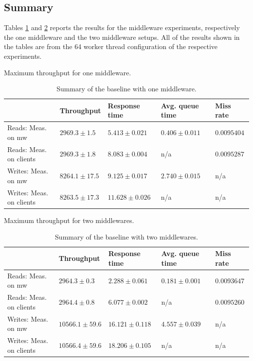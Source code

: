 \documentclass[11pt,a4paper]{article}
\begin{document}
\subsection{Summary} \label{sec:mwb-summary}
Tables \ref{tab:mwb1-summary} and \ref{tab:mwb2-summary} reports the results for the middleware experiments, respectively the one middleware and the two middleware setups. All of the results shown in the tables are from the 64 worker thread configuration of the respective experiments.

\begin{table}[h]
\centering
{Maximum throughput for one middleware.}
\begin{tabular}{|l|p{2.3cm}|p{2.3cm}|p{2.7cm}|p{2.3cm}|}
\hline                       & Throughput        & {\small Response time}      & {\small Avg. queue time} & Miss rate \\ 
\hline Reads: Meas. on mw       & $2969.3 \pm 1.5$  & $5.413 \pm 0.021$  & $0.406 \pm 0.011$  & $0.0095404$ \\ 
\hline Reads: Meas. on clients  & $2969.3 \pm 1.8$  & $8.083 \pm 0.004$  & n/a                & $0.0095287$ \\ 
\hline Writes: Meas. on mw      & $8264.1 \pm 17.5$ & $9.125 \pm 0.017$  & $2.740 \pm 0.015$  & n/a \\ 
\hline Writes: Meas. on clients & $8263.5 \pm 17.3$ & $11.628 \pm 0.026$ & n/a                & n/a \\ 
\hline 
\end{tabular}
\caption{Summary of the baseline with one middleware.} \label{tab:mwb1-summary}
\end{table}
\begin{table}[h]
\centering
{Maximum throughput for two middlewares.}
\begin{tabular}{|l|p{2.3cm}|p{2.3cm}|p{2.7cm}|p{2.3cm}|}
\hline                      & Throughput         & {\small Response time}      & {\small Avg. queue time} & Miss rate \\ 
\hline Reads: Meas. on mw       & $2964.3 \pm 0.3$   & $2.288 \pm 0.061$  & $0.181 \pm 0.001$  & $0.0093647$ \\ 
\hline Reads: Meas. on clients  & $2964.4 \pm 0.8$   & $6.077 \pm 0.002$  & n/a                & $0.0095260$ \\ 
\hline Writes: Meas. on mw      & $10566.1 \pm 59.6$ & $16.121 \pm 0.118$ & $4.557 \pm 0.039$  & n/a     \\ 
\hline Writes: Meas. on clients & $10566.4 \pm 59.6$ & $18.206 \pm 0.105$ & n/a                & n/a     \\ 
\hline 
\end{tabular}
\caption{Summary of the baseline with two middlewares.} \label{tab:mwb2-summary}
\end{table}
\end{document}
